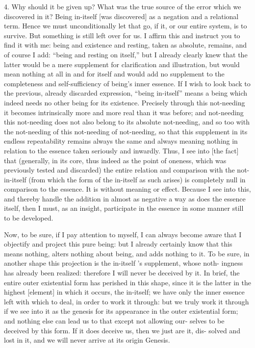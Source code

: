 4. Why should it be given up?
What was the true source of the error
which we discovered in it?
Being in-itself [was discovered] as
a negation and a relational term.
Hence we must unconditionally let that go,
if it, or our entire system, is to survive.
But something is still left over for us.
I affirm this and instruct you to find it with me:
being and existence and resting,
taken as absolute, remains,
and of course I add:
“being and resting on itself,”
but I already clearly knew that
the latter would be a mere supplement
for clarification and illustration,
but would mean nothing at all
in and for itself
and would add no supplement to the
completeness and self-sufficiency of
being’s inner essence.
If I wish to look back to the previous,
already discarded expression,
“being in-itself” means a being
which indeed needs no other being for its existence.
Precisely through this not-needing
it becomes intrinsically more and more
real than it was before;
and not-needing this not-needing does not also
belong to its absolute not-needing,
and so too with the not-needing of
this not-needing of not-needing,
so that this supplement in its
endless repeatability remains always the same
and always meaning nothing in relation to
the essence taken seriously and inwardly.
Thus, I see into [the fact] that
(generally, in its core,
thus indeed as the point of oneness,
which was previously tested and discarded)
the entire relation and comparison
with the not-in-itself
(from which the form of the in-itself as such arises)
is completely null in comparison to the essence.
It is without meaning or effect.
Because I see into this,
and thereby handle the addition
in almost as negative a way
as does the essence itself,
then I must, as an insight,
participate in the essence
in some manner still to be developed.

Now, to be sure, if I pay attention to myself, I can always become aware
that I objectify and project this pure being: but I already certainly know that
this means nothing, alters nothing about being, and adds nothing to it.
To be
sure, in another shape this projection is the in-itself ’s supplement, whose noth-
ingness has already been realized: therefore I will never be deceived by it.
In
brief, the entire outer existential form has perished in this shape, since it is the
latter in the highest [element] in which it occurs, the in-itself; we have only the
inner essence left with which to deal, in order to work it through: but we truly
work it through if we see into it as the genesis for its appearance in the outer
existential form; and nothing else can lead us to that except not allowing our-
selves to be deceived by this form.
If it does deceive us, then we just are it, dis-
solved and lost in it, and we will never arrive at its origin {Genesis}.

